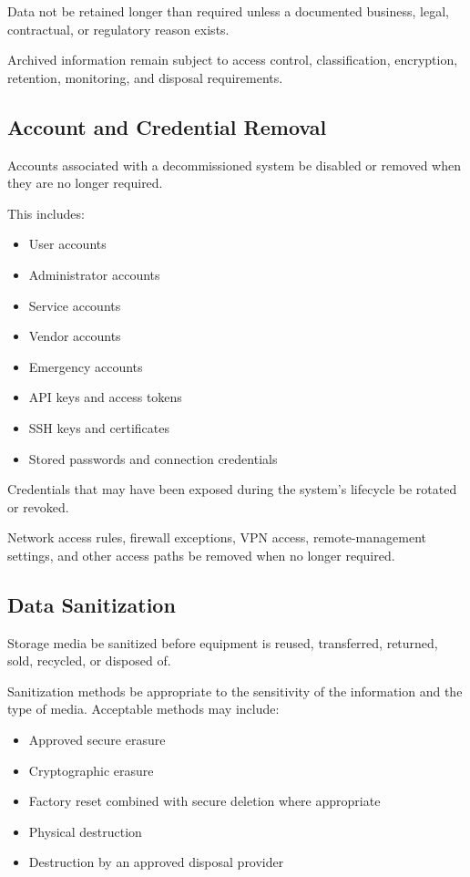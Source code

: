 Data \must{} not be retained longer than required unless a documented business, legal, contractual, or regulatory reason exists.

Archived information \must{} remain subject to access control, classification, encryption, retention, monitoring, and disposal requirements.

\subsection{Account and Credential Removal}

Accounts associated with a decommissioned system \must{} be disabled or removed when they are no longer required.

This includes:
\begin{itemize}
    \item User accounts
    \item Administrator accounts
    \item Service accounts
    \item Vendor accounts
    \item Emergency accounts
    \item API keys and access tokens
    \item SSH keys and certificates
    \item Stored passwords and connection credentials
\end{itemize}

Credentials that may have been exposed during the system's lifecycle \should{} be rotated or revoked.

Network access rules, firewall exceptions, VPN access, remote-management settings, and other access paths \must{} be removed when no longer required.

\subsection{Data Sanitization}

Storage media \must{} be sanitized before equipment is reused, transferred, returned, sold, recycled, or disposed of.

Sanitization methods \must{} be appropriate to the sensitivity of the information and the type of media. Acceptable methods may include:
\begin{itemize}
    \item Approved secure erasure
    \item Cryptographic erasure
    \item Factory reset combined with secure deletion where appropriate
    \item Physical destruction
    \item Destruction by an approved disposal provider
\end{itemize}

